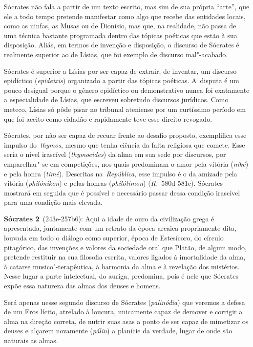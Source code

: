Sócrates não fala a partir de um texto escrito, mas sim de sua própria
``arte'', que ele a todo tempo pretende manifestar como algo que recebe
das entidades locais, como as ninfas, as Musas ou de Dionísio, mas que,
na realidade, não passa de uma técnica bastante programada dentro das
tópicas poéticas que estão à sua disposição. Aliás, em termos de
invenção e disposição, o discurso de Sócrates é realmente superior ao de
Lísias, que foi exemplo de discurso mal"-acabado.

Sócrates é superior a Lísias por ser capaz de extrair, de inventar, um
discurso epidíctico (\emph{epideixis}) organizado a partir das tópicas
poéticas. A~disputa é um pouco desigual porque o gênero epidíctico ou
demonstrativo nunca foi exatamente a especialidade de Lísias, que
escreveu sobretudo discursos jurídicos. Como meteco, Lísias só pôde
pisar no tribunal ateniense por um curtíssimo período em que foi aceito
como cidadão e rapidamente teve esse direito revogado.

Sócrates, por não ser capaz de recuar frente ao desafio proposto,
exemplifica esse impulso do~\emph{thymos}, mesmo que tenha ciência da
falta religiosa que comete. Esse seria o nível irascível
(\emph{thymoeides}) da alma em sua sede por discursos, por emparelhar"-se
em competições, nos quais predominam o amor pela vitória (\emph{niké}) e
pela honra (\emph{timé}). Descritas na~\emph{República}, esse impulso é
o da amizade pela vitória (\emph{philónikon}) e pelas honras
(\emph{philótimon}) (\emph{R.}~580d-581c). Sócrates mostrará em seguida
que é possível e necessário passar dessa condição irascível para uma
condição mais elevada.

\textbf{Sócrates 2}~(243e-257b6): Aqui a idade de ouro da civilização
grega é apresentada, juntamente com um retrato da época arcaica
propriamente dita, louvada em todo o diálogo como superior, época de
Estesícoro, do círculo pitagórico, das invenções e valores da sociedade
oral que Platão, de algum modo, pretende restituir na sua filosofia
escrita, valores ligados à imortalidade da alma, à catarse
musico"-terapêutica, à harmonia da alma e à revelação dos mistérios.
Nesse lugar a parte intelectual, do auriga, predomina, pois é nele que
Sócrates expõe essa natureza das almas dos deuses e homens.

Será apenas nesse segundo discurso de Sócrates (\emph{palinódia}) que
veremos a defesa de um Eros lícito, atrelado à loucura, unicamente capaz
de demover e corrigir a alma na direção correta, de nutrir suas asas a
ponto de ser capaz de mimetizar os deuses e alçarem novamente
(\emph{pálin}) a planície da verdade, lugar de onde são naturais as
almas.

